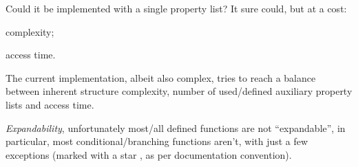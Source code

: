 \documentclass[10pt]{article}
\begin{document}
\begin{tsremark}[Note:]
 Could it be implemented with a single property list? It sure could, but at a cost: 
\begin{enumerate*}   \item complexity;    \item access time.   \end{enumerate*}
The current implementation, albeit also complex, tries to reach a balance between inherent structure complexity, number of used/defined auxiliary property lists and access time.
\end{tsremark}

\begin{tsremark}
 \textsl{Expandability}, unfortunately most/all defined functions are not ``expandable'', in particular, most conditional/branching functions aren't, with just a few exceptions (marked with a star , as per  documentation convention).
 
\end{tsremark}
\end{document}
